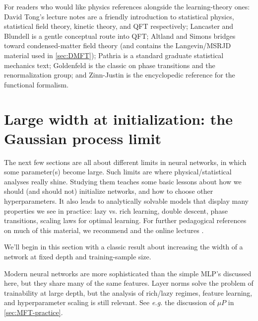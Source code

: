 \documentclass[11pt]{article}
\begin{document}
For readers who would like physics references alongside the learning-theory ones: David Tong's lecture notes \cite{TongStatPhysics,TongSFT,TongKineticTheory,TongQFT} are a friendly introduction to statistical physics, statistical field theory, kinetic theory, and QFT respectively; Lancaster and Blundell \cite{lancaster2014quantumGifted} is a gentle conceptual route into QFT; Altland and Simons \cite{altlandCondensedMatterField2010} bridges toward condensed-matter field theory (and contains the Langevin/MSRJD material used in \cref{sec:DMFT}); Pathria \cite{pathriaStatisticalMechanics2011} is a standard graduate statistical mechanics text; Goldenfeld \cite{goldenfeldLecturesPhaseTransitions2018a} is the classic on phase transitions and the renormalization group; and Zinn-Justin \cite{zinn2002quantum} is the encyclopedic reference for the functional formalism.





\section{Large width at initialization: the Gaussian process limit}
\label{sec:init}

The next few sections are all about different limits in neural networks, in which some parameter(s) become large. Such limits are where physical/statistical analyses really shine. Studying them teaches some basic lessons about how we should (and should not) initialize networks, and how to choose other hyperparameters. It also leads to analytically solvable models that display many properties we see in practice: lazy vs. rich learning, double descent, phase transitions, scaling laws for optimal learning. For further pedagogical references on much of this material, we recommend \cite{roberts2022principles,spiliopoulos2025foundations,ringel2025applications} and the online lectures \cite{hanin2026mdl}.

We'll begin in this section with a classic result \cite{neal1996bayesian, lee2018deep, yang2019tensorprograms1, hanin2023random} about increasing the width of a network at fixed depth and training-sample size.

\smallskip
Modern neural networks are more sophisticated than the simple MLP's discussed here, but they share many of the same features. Layer norms solve the problem of trainability at large depth, but the analysis of rich/lazy regimes, feature learning, and hyperparameter scaling is still relevant. See \emph{e.g.} the discussion of $\mu P$ in \cref{sec:MFT-practice}.
\end{document}
